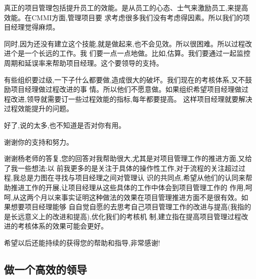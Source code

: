 \documentclass[11pt]{article}
\begin{document}
\begin{yang}
真正的项目管理包括提升员工的效能。是从员工的心态、士气来激励员工,来提高效能。在CMMI方面,管理项目要
求考虑很多我们没有考虑得因素。所以我们的项目经理觉得麻烦。

同时,因为还没有建立这个技能,就是做起来,也不会见效。所以很困难。所以过程改进个是一个长远的工作。我
们要一点一点地做。比如,估算。我们要通过一起监控周期和延误率来帮助项目经理。这个要领导的支持。

有些组织要过级,一下子什么都要做,造成很大的破坏。我们现在的考核体系,又不鼓励项目经理做过程改进的事
情。所以他们不愿意做。如果组织希望项目经理做过程改进,领导就需要订一些过程效能的指标,每年都要提高。
这样项目经理就要解决过程效能提升的问题。

好了,说的太多,也不知道是否对你有用。

谢谢你的支持和努力。
\end{yang}

\begin{staff}
  \slogo 谢谢杨老师的答复,您的回答对我帮助很大,尤其是对项目管理工作的推进方面,又给了我一些想法:以
  前我更多的是关注于具体的操作性工作,对于流程的关注超过过程,我总是力图在寻找与项目经理之间对管理认
  识的共同点,希望从他们的认同来帮助推进工作的开展,让项目经理从这些具体的工作中体会到项目管理工作的
  作用,呵呵,从这两个月以来事实证明这种做法的效果在项目管理推进方面不是很有效。如果想要项目经理能够
  自自觉自愿的去思考自己项目管理工作的改进与提高(我指的是长远意义上的改进和提高),优化我们的考核机
  制,建立指在提高项目管理过程改进的考核体系的效果可能会更好。

  希望以后还能持续的获得您的帮助和指导,非常感谢!
\end{staff}

\subsection{做一个高效的领导}
\end{document}
